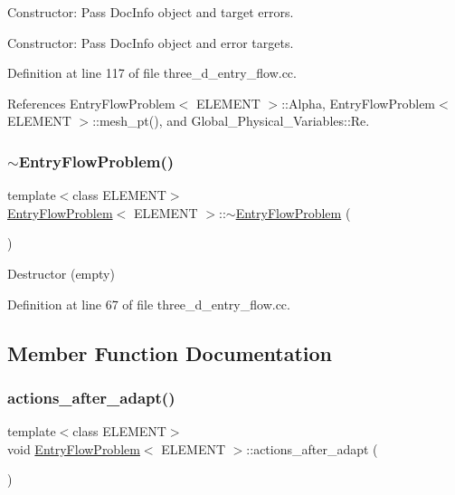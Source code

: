 Constructor\+: Pass Doc\+Info object and target errors. 

Constructor\+: Pass Doc\+Info object and error targets. 

Definition at line 117 of file three\+\_\+d\+\_\+entry\+\_\+flow.\+cc.



References Entry\+Flow\+Problem$<$ E\+L\+E\+M\+E\+N\+T $>$\+::\+Alpha, Entry\+Flow\+Problem$<$ E\+L\+E\+M\+E\+N\+T $>$\+::mesh\+\_\+pt(), and Global\+\_\+\+Physical\+\_\+\+Variables\+::\+Re.

\mbox{\label{classEntryFlowProblem_a22d76abde64459f167067c1d2cb5c1e2}} 
\subsubsection{\texorpdfstring{$\sim$\+Entry\+Flow\+Problem()}{~EntryFlowProblem()}}
{\footnotesize\ttfamily template$<$class E\+L\+E\+M\+E\+NT$>$ \\
\hyperlink{classEntryFlowProblem}{Entry\+Flow\+Problem}$<$ E\+L\+E\+M\+E\+NT $>$\+::$\sim$\hyperlink{classEntryFlowProblem}{Entry\+Flow\+Problem} (\begin{DoxyParamCaption}{ }\end{DoxyParamCaption})\hspace{0.3cm}{\ttfamily [inline]}}



Destructor (empty) 



Definition at line 67 of file three\+\_\+d\+\_\+entry\+\_\+flow.\+cc.



\subsection{Member Function Documentation}
\mbox{\label{classEntryFlowProblem_ae472a4319c372d33ee22dac8fb32d9a2}} 
\subsubsection{\texorpdfstring{actions\+\_\+after\+\_\+adapt()}{actions\_after\_adapt()}}
{\footnotesize\ttfamily template$<$class E\+L\+E\+M\+E\+NT$>$ \\
void \hyperlink{classEntryFlowProblem}{Entry\+Flow\+Problem}$<$ E\+L\+E\+M\+E\+NT $>$\+::actions\+\_\+after\+\_\+adapt (\begin{DoxyParamCaption}{ }\end{DoxyParamCaption})\hspace{0.3cm}{\ttfamily [inline]}}



